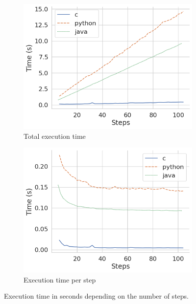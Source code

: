 \documentclass[english,submission]{programming}
\begin{document}
\begin{figure}[htbp]
  \centering
  \begin{subfigure}[b]{0.45\textwidth}
      \centering
      \includegraphics[width=\textwidth]{img/execute.png}
      \caption{\centering Total execution time}
      \label{subfig:execute-time-total}
  \end{subfigure}
  \hfill
  \begin{subfigure}[b]{0.45\textwidth}
      \centering
      \includegraphics[width=\textwidth]{img/execute_ps.png}
      \caption{\centering Execution time per step}
      \label{subfig:execute-time-ps}
  \end{subfigure}
  \caption{Execution time in seconds depending on the number of steps.}
  \label{fig:execute-time}
\end{figure}
\end{document}
